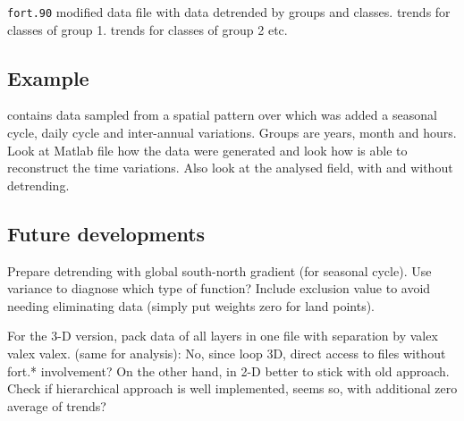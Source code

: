 \texttt{fort.90} modified data file with data detrended by groups and classes.  trends for classes of group 1.  trends for classes of group 2 etc.

\subsection{Example}

 contains data sampled from a spatial pattern over which was added a seasonal cycle, daily cycle and inter-annual variations. Groups are years, month and hours. Look at Matlab file  how the data were generated and look how  is able to reconstruct the time variations. Also look at the analysed field, with and without detrending.


\subsection{Future developments}	%

Prepare detrending with global south-north gradient (for seasonal cycle). Use variance to diagnose which type of function?
Include exclusion value to avoid needing eliminating data (simply put weights zero for land points).

For the 3-D version, pack data of all layers in one file with separation by valex valex valex. (same for analysis): No, since loop 3D, direct access to files without fort.* involvement? On the other hand, in 2-D better to stick with old approach. 
Check if hierarchical approach is well implemented, seems so, with additional zero average of trends? 
